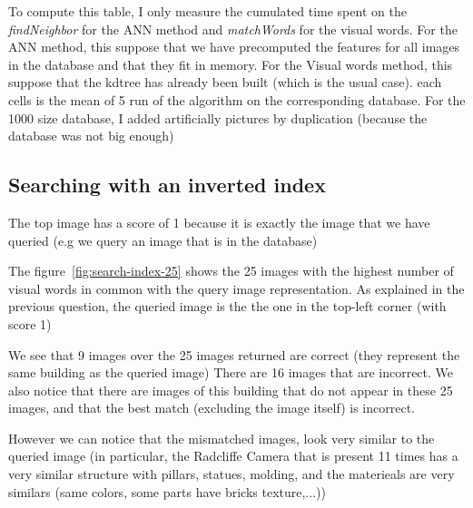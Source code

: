 \documentclass{article}
\begin{document}
To compute this table, I only measure the cumulated time spent on the
\emph{findNeighbor} for the ANN method and \emph{matchWords} for the
visual words. For the ANN method, this suppose that we have
precomputed the features for all images in the database and that they
fit in memory. For the Visual words method, this suppose that the
kdtree has already been built (which is the usual case).
each cells is the mean of 5 run of the algorithm on the corresponding
database. For the 1000 size database, I added artificially pictures
by duplication (because the database was not big enough)

\subsection{Searching with an inverted index}


The top image has a score of 1 because it is exactly the image
that we have queried (e.g we query an image that is in the database)


The figure~\ref{fig:search-index-25} shows the 25 images with the
highest number of visual words in common with the query image
representation.  As explained in the previous question, the queried
image is the the one in the top-left corner (with score 1)


We see that 9 images over the 25 images returned are correct (they
represent the same building as the queried image) There are 16 images
that are incorrect. We also notice that there are images of this
building that do not appear in these 25 images, and that the best
match (excluding the image itself) is incorrect.

However we can notice that the mismatched images, look very similar to
the queried image (in particular, the Radcliffe Camera that is present
11 times has a very similar structure with pillars, statues, molding,
and the materieals are very similars (same colors, some parts have
bricks texture,...))
\end{document}
